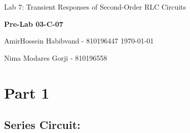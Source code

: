 \documentclass[a4paper,twoside]{report}
\begin{document}
    {\large Lab 7: Transient Responses of Second-Order RLC Circuits }
    \hfill
    {\large \textbf{Pre-Lab 03-C-07} \par}
	\vspace{0.1in}
    {\large AmirHossein Habibvand - 810196447}
    \hfill
    \today \par
    {\large Nima Modares Gorji - 810196558 \par}
	\vspace{0.5in}

    \section*{Part 1}
        \subsection*{Series Circuit:}
\end{document}
